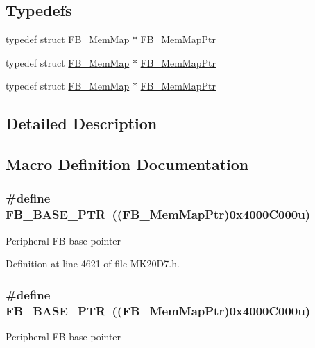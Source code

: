 \subsection*{Typedefs}
\begin{DoxyCompactItemize}
\item 
typedef struct \hyperlink{struct_f_b___mem_map}{F\+B\+\_\+\+Mem\+Map} $\ast$ \hyperlink{group___f_b___peripheral_gaebb09d71e958c6590cf946799cb4aa11}{F\+B\+\_\+\+Mem\+Map\+Ptr}
\item 
typedef struct \hyperlink{struct_f_b___mem_map}{F\+B\+\_\+\+Mem\+Map} $\ast$ \hyperlink{group___f_b___peripheral_gaebb09d71e958c6590cf946799cb4aa11}{F\+B\+\_\+\+Mem\+Map\+Ptr}
\item 
typedef struct \hyperlink{struct_f_b___mem_map}{F\+B\+\_\+\+Mem\+Map} $\ast$ \hyperlink{group___f_b___peripheral_gaebb09d71e958c6590cf946799cb4aa11}{F\+B\+\_\+\+Mem\+Map\+Ptr}
\end{DoxyCompactItemize}


\subsection{Detailed Description}


\subsection{Macro Definition Documentation}
\subsubsection[{\texorpdfstring{F\+B\+\_\+\+B\+A\+S\+E\+\_\+\+P\+TR}{FB_BASE_PTR}}]{\setlength{\rightskip}{0pt plus 5cm}\#define F\+B\+\_\+\+B\+A\+S\+E\+\_\+\+P\+TR~(({\bf F\+B\+\_\+\+Mem\+Map\+Ptr})0x4000\+C000u)}\hypertarget{group___f_b___peripheral_gace69013248279ed94480b3d6f6aa9fa6}{}\label{group___f_b___peripheral_gace69013248279ed94480b3d6f6aa9fa6}
Peripheral FB base pointer 

Definition at line 4621 of file M\+K20\+D7.\+h.

\subsubsection[{\texorpdfstring{F\+B\+\_\+\+B\+A\+S\+E\+\_\+\+P\+TR}{FB_BASE_PTR}}]{\setlength{\rightskip}{0pt plus 5cm}\#define F\+B\+\_\+\+B\+A\+S\+E\+\_\+\+P\+TR~(({\bf F\+B\+\_\+\+Mem\+Map\+Ptr})0x4000\+C000u)}\hypertarget{group___f_b___peripheral_gace69013248279ed94480b3d6f6aa9fa6}{}\label{group___f_b___peripheral_gace69013248279ed94480b3d6f6aa9fa6}
Peripheral FB base pointer 

